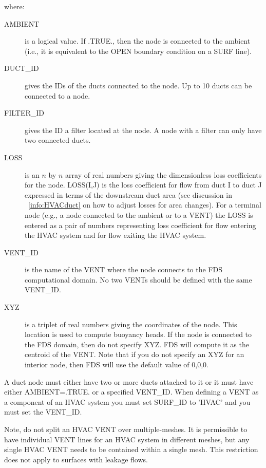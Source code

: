 \documentclass[11pt]{book}
\begin{document}
\noindent where:

\begin{description}
\item[{\ct AMBIENT}] is a logical value.  If {\ct .TRUE.}, then the node is connected to the ambient (i.e., it is equivalent to the {\ct OPEN} boundary condition on a {\ct SURF} line).
\item[{\ct DUCT\_ID}] gives the {\ct ID}s of the ducts connected to the node.  Up to 10 ducts can be connected to a node.
\item[{\ct FILTER\_ID}] gives the {\ct ID} a filter located at the node.  A node with a filter can only have two connected ducts.
\item[{\ct LOSS}] is an $n$ by $n$ array of real numbers giving the dimensionless loss coefficients for the node.  {\ct LOSS(I,J)} is the loss coefficient for flow from duct {\ct I} to duct {\ct J} expressed in terms of the downstream duct area (see discussion in ~\ref{info:HVACduct} on how to adjust losses for area changes).  For a terminal node (e.g., a node connected to the ambient or to a {\ct VENT}) the {\ct LOSS} is entered as a pair of numbers representing loss coefficient for flow entering the HVAC system and for flow exiting the HVAC system.
\item[{\ct VENT\_ID}] is the name of the {\ct VENT} where the node connects to the FDS computational domain.  No two {\ct VENTs} should be defined with the same {\ct VENT\_ID}.
\item[{\ct XYZ}] is a triplet of real numbers giving the coordinates of the node.  This location is used to compute buoyancy heads.
If the node is connected to the FDS domain, then do not specify {\ct XYZ}.  FDS will compute it as the centroid of the {\ct VENT}. Note that if you do not specify an {\ct XYZ} for an interior node, then FDS will use the default value of 0,0,0.
\end{description}

\noindent
A duct node must either have two or more ducts attached to it or it must have either {\ct AMBIENT=.TRUE.} or a specified {\ct VENT\_ID}.  When defining a {\ct VENT} as a component of an HVAC system you must set {\ct SURF\_ID} to {\ct 'HVAC'} and you must set the {\ct VENT\_ID}.

Note, do not split an HVAC {\ct VENT} over multiple-meshes. It is permissible to have individual {\ct VENT} lines for an HVAC system in different meshes, but any single HVAC {\ct VENT} needs to be contained within a single mesh. This restriction does not apply to surfaces with leakage flows.
\end{document}
